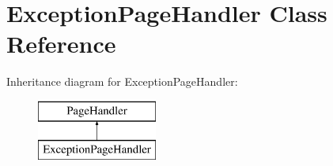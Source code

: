 \hypertarget{classExceptionPageHandler}{\section{Exception\-Page\-Handler Class Reference}
\label{classExceptionPageHandler}
}
Inheritance diagram for Exception\-Page\-Handler\-:\begin{figure}[H]
\begin{center}
\leavevmode
\includegraphics[height=2.000000cm]{classExceptionPageHandler}
\end{center}
\end{figure}
